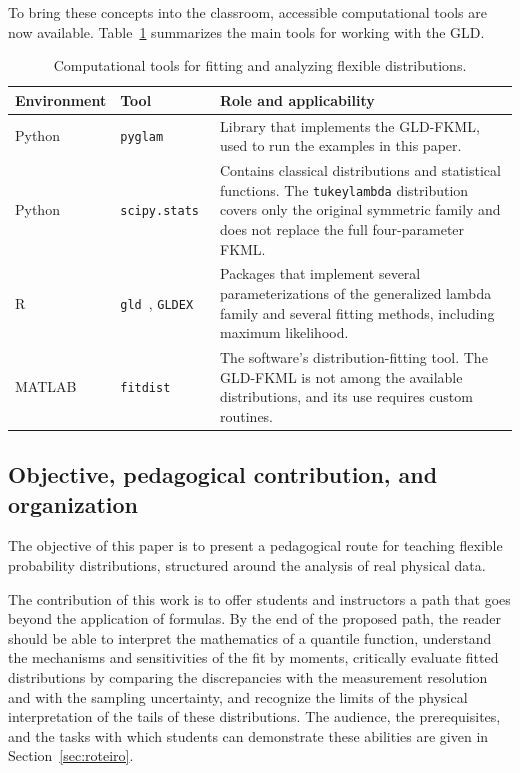 To bring these concepts into the classroom, accessible computational tools are now available. Table~\ref{tab:ferramentas} summarizes the main tools for working with the GLD.

\begin{table}[htbp]
\centering
\caption{Computational tools for fitting and analyzing flexible distributions.}
\label{tab:ferramentas}
\small
\begin{tabular}{p{2.5cm} p{3.0cm} p{8.5cm}}
\toprule
\textbf{Environment} & \textbf{Tool} & \textbf{Role and applicability} \\
\midrule
Python & \texttt{pyglam}~\cite{pyglam} & Library that implements the GLD-FKML, used to run the examples in this paper. \\
Python & \texttt{scipy.stats}~\cite{scipy2020} & Contains classical distributions and statistical functions. The \texttt{tukeylambda} distribution covers only the original symmetric family and does not replace the full four-parameter FKML. \\
R & \texttt{gld}~\cite{KingGld}, \texttt{GLDEX}~\cite{su2007} & Packages that implement several parameterizations of the generalized lambda family and several fitting methods, including maximum likelihood. \\
MATLAB & \texttt{fitdist}~\cite{matlabfitdist} & The software's distribution-fitting tool. The GLD-FKML is not among the available distributions, and its use requires custom routines. \\
\bottomrule
\end{tabular}
\end{table}

\subsection{Objective, pedagogical contribution, and organization}

The objective of this paper is to present a pedagogical route for teaching flexible probability distributions, structured around the analysis of real physical data.

The contribution of this work is to offer students and instructors a path that goes beyond the application of formulas. By the end of the proposed path, the reader should be able to interpret the mathematics of a quantile function, understand the mechanisms and sensitivities of the fit by moments, critically evaluate fitted distributions by comparing the discrepancies with the measurement resolution and with the sampling uncertainty, and recognize the limits of the physical interpretation of the tails of these distributions. The audience, the prerequisites, and the tasks with which students can demonstrate these abilities are given in Section~\ref{sec:roteiro}.

